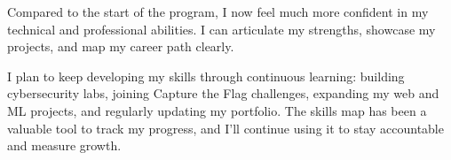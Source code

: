 \documentclass[12pt,a4paper]{article}
\begin{document}
Compared to the start of the program, I now feel much more confident in my technical and professional abilities. I can articulate my strengths, showcase my projects, and map my career path clearly.  

I plan to keep developing my skills through continuous learning: building cybersecurity labs, joining Capture the Flag challenges, expanding my web and ML projects, and regularly updating my portfolio. The skills map has been a valuable tool to track my progress, and I’ll continue using it to stay accountable and measure growth.
\end{document}
